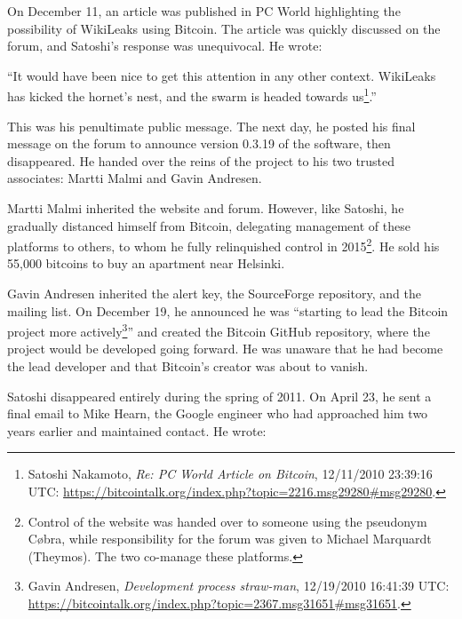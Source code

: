 \documentclass[
  a5paper,
  smalldemyvopaper,10pt,twoside,onecolumn,openright,extrafontsizes,hidelinks]{memoir}
\begin{document}
On December 11, an article was published in PC World highlighting the
possibility of WikiLeaks using Bitcoin. The article was quickly
discussed on the forum, and Satoshi's response was unequivocal. He
wrote:

``It would have been nice to get this attention in any other context.
WikiLeaks has kicked the hornet's nest, and the swarm is headed towards
us\footnote{Satoshi Nakamoto, \emph{Re: PC World Article on Bitcoin},
  12/11/2010 23:39:16 UTC:
  \url{https://bitcointalk.org/index.php?topic=2216.msg29280\#msg29280}.}.''

This was his penultimate public message. The next day, he posted his
final message on the forum to announce version 0.3.19 of the software,
then disappeared. He handed over the reins of the project to his two
trusted associates: Martti Malmi and Gavin Andresen.

Martti Malmi inherited the website and forum. However, like Satoshi, he
gradually distanced himself from Bitcoin, delegating management of these
platforms to others, to whom he fully relinquished control in
2015\footnote{Control of the website was handed over to someone using
  the pseudonym Cøbra, while responsibility for the forum was given to
  Michael Marquardt (Theymos). The two co-manage these platforms.}. He
sold his 55,000 bitcoins to buy an apartment near Helsinki.

Gavin Andresen inherited the alert key, the SourceForge repository, and
the mailing list. On December 19, he announced he was ``starting to lead
the Bitcoin project more actively\footnote{Gavin Andresen,
  \emph{Development process straw-man}, 12/19/2010 16:41:39 UTC:
  \url{https://bitcointalk.org/index.php?topic=2367.msg31651\#msg31651}.}''
and created the Bitcoin GitHub repository, where the project would be
developed going forward. He was unaware that he had become the lead
developer and that Bitcoin's creator was about to vanish.

Satoshi disappeared entirely during the spring of 2011. On April 23, he
sent a final email to Mike Hearn, the Google engineer who had approached
him two years earlier and maintained contact. He wrote:
\end{document}

